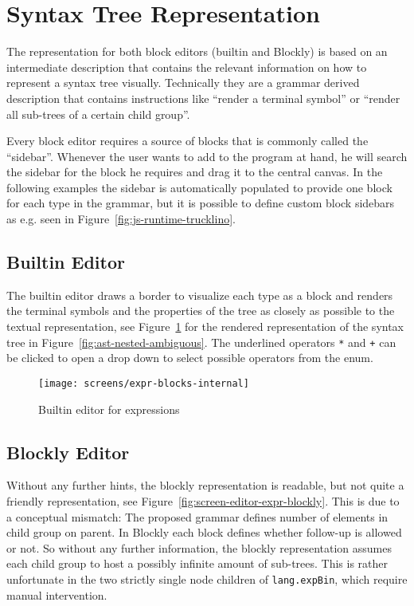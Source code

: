 \documentclass[sigconf,natbib=false,review=true,anonymous]{acmart}
\begin{document}
\section{Syntax Tree Representation}

The representation for both block editors (builtin and Blockly) is based on an intermediate description that contains the relevant information on how to represent a syntax tree visually. Technically they are a grammar derived description that contains instructions like \enquote{render a terminal symbol} or \enquote{render all sub-trees of a certain child group}.

Every block editor requires a source of blocks that is commonly called the \enquote{sidebar}. Whenever the user wants to add to the program at hand, he will search the sidebar for the block he requires and drag it to the central canvas. In the following examples the sidebar is automatically populated to provide one block for each type in the grammar, but it is possible to define custom block sidebars as e.g. seen in Figure~\ref{fig:js-runtime-trucklino}.

\subsection{Builtin Editor}

The builtin editor draws a border to visualize each type as a block and renders the terminal symbols and the properties of the tree as closely as possible to the textual representation, see Figure~\ref{fig:screen-editor-expr-internal} for the rendered representation of the syntax tree in Figure~\ref{fig:ast-nested-ambiguous}. The underlined operators \texttt{*} and \texttt{+} can be clicked to open a drop down to select possible operators from the enum.

\begin{figure}[H]
  \texttt{[image: screens/expr-blocks-internal]}
  \caption{Builtin editor for expressions}
  \label{fig:screen-editor-expr-internal}
\end{figure}

\subsection{Blockly Editor}

Without any further hints, the blockly representation is readable, but not quite a friendly representation, see Figure~\ref{fig:screen-editor-expr-blockly}. This is due to a conceptual mismatch: The proposed grammar defines number of elements in child group on parent. In Blockly each block defines whether follow-up is allowed or not. So without any further information, the blockly representation assumes each child group to host a possibly infinite amount of sub-trees. This is rather unfortunate in the two strictly single node children of \texttt{lang.expBin}, which require manual intervention.
\end{document}

